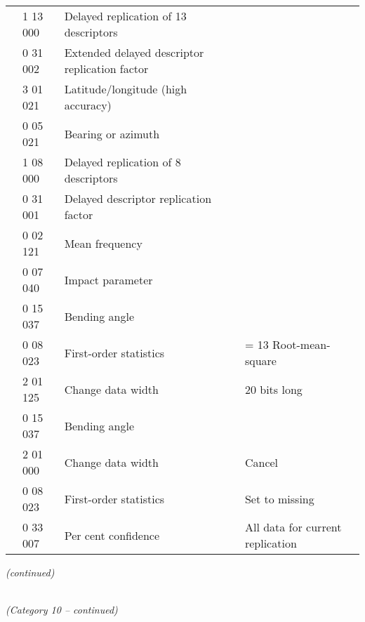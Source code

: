 \begin{longtable}[]{@{}llll@{}}
& 1 13 000 & Delayed replication of 13 descriptors &\tabularnewline
& 0 31 002 & Extended delayed descriptor replication factor &\tabularnewline
& 3 01 021 & Latitude/longitude (high accuracy) &\tabularnewline
& 0 05 021 & Bearing or azimuth &\tabularnewline
& 1 08 000 & Delayed replication of 8 descriptors &\tabularnewline
& 0 31 001 & Delayed descriptor replication factor &\tabularnewline
& 0 02 121 & Mean frequency &\tabularnewline
& 0 07 040 & Impact parameter &\tabularnewline
& 0 15 037 & Bending angle &\tabularnewline
& 0 08 023 & First-order statistics & = 13 Root-mean-square\tabularnewline
& 2 01 125 & Change data width & 20 bits long\tabularnewline
& 0 15 037 & Bending angle &\tabularnewline
& 2 01 000 & Change data width & Cancel\tabularnewline
& 0 08 023 & First-order statistics & Set to missing\tabularnewline
& 0 33 007 & Per cent confidence & All data for current replication\tabularnewline
\bottomrule
\end{longtable}

\emph{(continued)}

\emph{\\
(Category 10 -- continued)}

